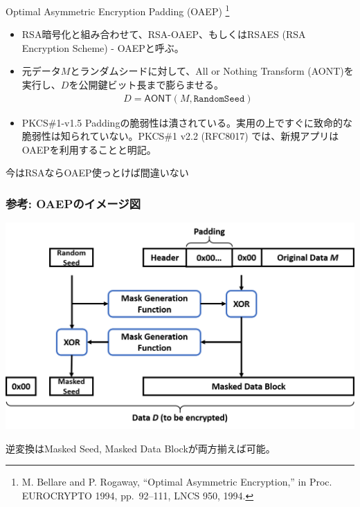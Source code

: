 \documentclass[12pt,dvipdfmx]{beamer}
\begin{document}
\begin{frame}

\begin{block}{\small Optimal Asymmetric Encryption Padding (OAEP) \footnote[frame]{\scriptsize M. Bellare and P. Rogaway, ``Optimal Asymmetric Encryption,'' in Proc. EUROCRYPTO 1994, pp.~92--111, LNCS 950, 1994.}}
\small
\begin{itemize}
 \item RSA暗号化と組み合わせて、RSA-OAEP、もしくはRSAES (RSA Encryption Scheme) - OAEPと呼ぶ。
 \item 元データ$M$とランダムシードに対して、All or Nothing Transform (AONT)を実行し、$D$を公開鍵ビット長まで膨らませる。
\begin{align*}
 D = \textsf{AONT}(M, \texttt{RandomSeed})
\end{align*}
 \item PKCS\#1-v1.5 Paddingの脆弱性は潰されている。実用の上ですぐに致命的な脆弱性は知られていない。PKCS\#1 v2.2 (RFC8017) では、\alert{新規アプリはOAEPを利用すること}と明記。
\end{itemize}
\end{block}

\begin{center}
 {\Large \alert{今はRSAならOAEP使っとけば間違いない}}
\end{center}
\end{frame}

\begin{frame}
\frametitle{参考: OAEPのイメージ図}
\begin{center}
 \includegraphics[width=\linewidth]{Figs/oaep.png}
\end{center}
逆変換はMasked Seed, Masked Data Blockが両方揃えば可能。
\end{frame}
\end{document}

